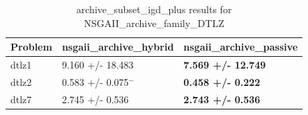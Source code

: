 \begin{table}
\caption{archive_subset_igd_plus results for NSGAII_archive_family_DTLZ}
\label{NSGAII_archive_family_DTLZ_archive_subset_igd_plus}
\begin{tabular}{lll}
\toprule
Problem & nsgaii_archive_hybrid & nsgaii_archive_passive \\
\midrule
dtlz1 & 9.160 +/- 18.483 & \textbf{7.569 +/- 12.749} \\
dtlz2 & 0.583 +/- 0.075$^{-}$ & \textbf{0.458 +/- 0.222} \\
dtlz7 & 2.745 +/- 0.536 & \textbf{2.743 +/- 0.536} \\
\bottomrule
\end{tabular}
\end{table}
